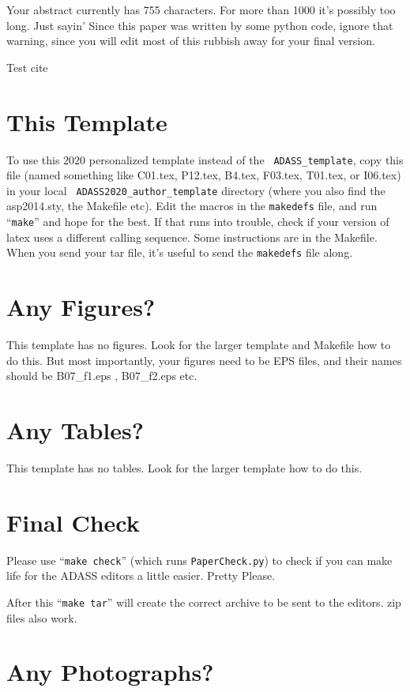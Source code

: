 \documentclass[11pt,twoside]{article}
\begin{document}
Your abstract currently has 755 characters. For more than 1000
it's possibly too long. Just sayin' Since this paper was written by
some python code, ignore that warning, since you will edit most of
this rubbish away for your final version.

Test cite \citep{2016ascl.soft05001H}


\section{This Template}

To use this 2020 personalized template instead of the {\tt
  ADASS\_template}, copy this file (named something like C01.tex,
P12.tex, B4.tex, F03.tex, T01.tex, or I06.tex) in your local {\tt
  ADASS2020\_author\_template} directory (where you also find the
asp2014.sty, the Makefile etc).  Edit the macros in the {\tt makedefs}
file, and run ``{\tt make}'' and hope for the best.  If that runs into
trouble, check if your version of latex uses a different calling
sequence.  Some instructions are in the Makefile. When you send your
tar file, it's useful to send the {\tt makedefs} file along.

\section{Any Figures?}

This template has no figures. Look for the larger template and
Makefile how to do this. But most importantly, your figures need to
be EPS files, and their names should be B07\_f1.eps ,
B07\_f2.eps  etc.

\section{Any Tables?}

This template has no tables. Look for the larger template
how to do this. 

\section{Final Check}

Please use ``{\tt make check}'' (which runs {\tt PaperCheck.py}) to
check if you can make life for the ADASS editors a little
easier. Pretty Please.

After this ``{\tt make tar}'' will create the correct archive to be sent to
the editors. zip files also work.

\section{Any Photographs?}
\end{document}
